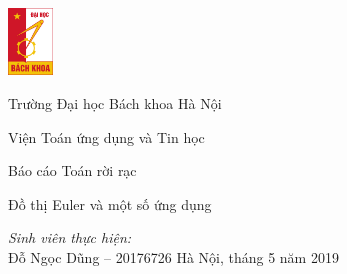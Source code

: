 \documentclass[14pt]{article}
\begin{document}
\begin{titlepage}
	\parbox{4.2em}{
		\includegraphics[width=3.2em]{resources/bk.jpg}
	}
	\parbox{\textwidth-4.6em}{
		{\LARGE Trường Đại học Bách khoa Hà Nội\par}
		{\Large Viện Toán ứng dụng và Tin học}
	}
	\vfill\vfill
	\begin{center}
		{\Large Báo cáo Toán rời rạc}\par
		{\LARGE Đồ thị Euler và một số ứng dụng}\par
		\vfill
		\textit{Sinh viên thực hiện:}\\
		Đỗ Ngọc Dũng -- 20176726
		\vfill
		Hà Nội, tháng 5 năm 2019
	\end{center}
\end{titlepage}
\end{document}
